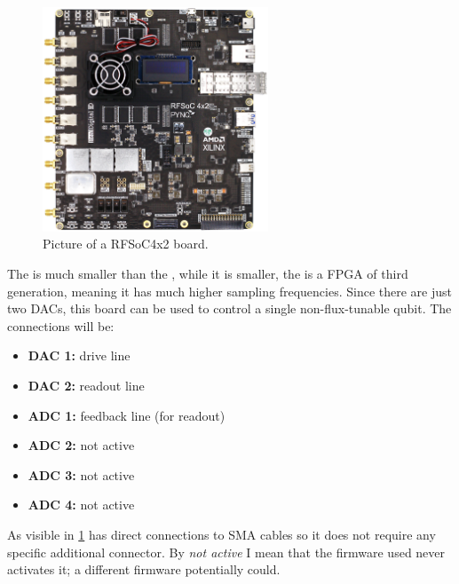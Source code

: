 \begin{figure}[ht]
    \centering
    \includegraphics[width=0.6\textwidth]{Setup-software/figures/rfsoc4x2.png}
    \caption{Picture of a RFSoC4x2 board.}
    \label{fig:rfsoc4x2}
\end{figure}

The \RFSoC is much smaller than the \ZCU, while it is smaller, the \RFSoC is a FPGA of third generation, meaning it has much higher sampling frequencies.
Since there are just two DACs, this board can be used to control a single non-flux-tunable qubit. The connections will be:
\begin{itemize}
    \item \textbf{DAC 1:} drive line
    \item \textbf{DAC 2:} readout line
    \item \textbf{ADC 1:} feedback line (for readout)
    \item \textbf{ADC 2:} not active
    \item \textbf{ADC 3:} not active
    \item \textbf{ADC 4:} not active
\end{itemize}
As visible in \cref{fig:rfsoc4x2} \RFSoC has direct connections to SMA cables so it does not require any specific additional connector.
By \textit{not active} I mean that the firmware used never activates it; a different firmware potentially could.

